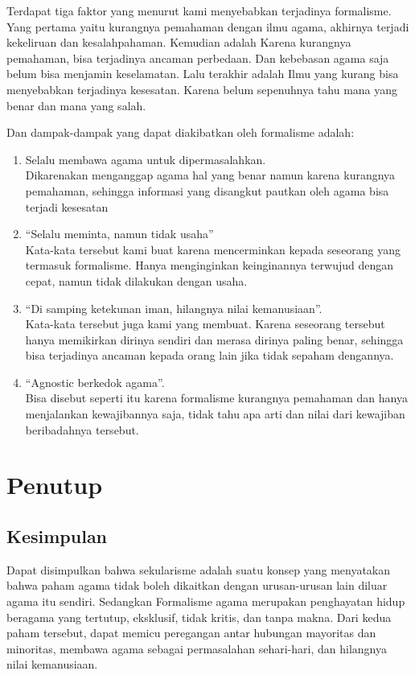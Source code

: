 \documentclass[
  12pt,
]{article}
\begin{document}
    Terdapat tiga faktor yang menurut kami menyebabkan terjadinya formalisme. Yang pertama yaitu kurangnya pemahaman dengan ilmu agama, akhirnya terjadi kekeliruan dan kesalahpahaman. Kemudian adalah Karena kurangnya pemahaman, bisa terjadinya ancaman perbedaan. Dan kebebasan agama saja belum bisa menjamin keselamatan. Lalu terakhir adalah Ilmu yang kurang bisa menyebabkan terjadinya kesesatan. Karena belum sepenuhnya tahu mana yang benar dan mana yang salah.
      
    Dan dampak-dampak yang dapat diakibatkan oleh formalisme adalah:
    \begin{enumerate}
      \item Selalu membawa agama untuk dipermasalahkan. \\
      Dikarenakan menganggap agama hal yang benar namun karena kurangnya pemahaman, sehingga informasi yang disangkut pautkan oleh agama bisa terjadi kesesatan 

      \item “Selalu meminta, namun tidak usaha” \\
      Kata-kata tersebut kami buat karena mencerminkan kepada seseorang yang termasuk formalisme. Hanya menginginkan keinginannya terwujud dengan cepat, namun tidak dilakukan dengan usaha.

      \item “Di samping ketekunan iman, hilangnya nilai kemanusiaan”. \\
      Kata-kata tersebut juga kami yang membuat.  Karena seseorang tersebut hanya memikirkan dirinya sendiri dan merasa dirinya paling benar, sehingga bisa terjadinya ancaman kepada orang lain jika tidak sepaham dengannya.

      \item “Agnostic berkedok agama”. \\
      Bisa disebut seperti itu karena formalisme kurangnya pemahaman dan hanya menjalankan kewajibannya saja, tidak tahu apa arti dan nilai dari kewajiban beribadahnya tersebut.
    \end{enumerate}
      
    \pagebreak

    \section{Penutup}

    \subsection{Kesimpulan}
    Dapat disimpulkan bahwa sekularisme adalah suatu konsep yang menyatakan bahwa paham agama tidak boleh dikaitkan dengan urusan-urusan lain diluar agama itu sendiri. Sedangkan Formalisme agama merupakan penghayatan hidup beragama yang tertutup, eksklusif, tidak kritis, dan tanpa makna. Dari kedua paham tersebut, dapat memicu peregangan antar hubungan mayoritas dan minoritas, membawa agama sebagai permasalahan sehari-hari, dan hilangnya nilai kemanusiaan.
\end{document}
